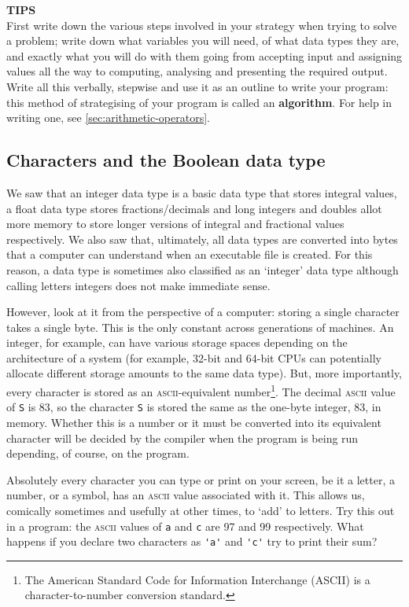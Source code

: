 \documentclass[11pt,oneside]{article}
\newcommand{\eb}[1]{\textbf{\scriptsize{\sffamily\addfontfeatures{LetterSpace=7} #1\\[.35em]}}}
\begin{document}
{{{{{{{\begin{errorbox}
\eb{TIPS }
First write down the various steps involved in your strategy when trying to solve a problem; write down what variables you will need, of what data types they are, and exactly what you will do with them going from accepting input and assigning values all the way to computing, analysing and presenting the required output. Write all this verbally, stepwise and use it as an outline to write your program: this method of strategising of your program is called an \textbf{algorithm}. For help in writing one, see \ref{sec:arithmetic-operators}.
\end{errorbox}

\subsection{Characters and the Boolean data type}\label{sec:characters-and-the-boolean-data-type}

We saw that an integer data type is a basic data type that stores integral values, a float data type stores fractions/decimals and long integers and doubles allot more memory to store longer versions of integral and fractional values respectively. We also saw that, ultimately, all data types are converted into bytes that a computer can understand when an executable file is created. For this reason, a  data type is sometimes also classified as an `integer' data type although calling letters integers does not make immediate sense.

However, look at it from the perspective of a computer: storing a single character takes a single byte. This is the only constant across generations of machines. An integer, for example, can have various storage spaces depending on the architecture of a system (for example, 32-bit and 64-bit CPUs can potentially allocate different storage amounts to the same data type). But, more importantly, every character is stored as an \textsc{ascii}-equivalent number\footnote{The American Standard Code for Information Interchange (\textsc{ASCII}) is a character-to-number conversion standard.}. The decimal \textsc{ascii} value of \verb+S+ is 83, so the character \verb+S+ is stored the same as the one-byte integer, 83, in memory. Whether this is a number or it must be converted into its equivalent character will be decided by the compiler when the program is being run depending, of course, on the program.

Absolutely every character you can type or print on your screen, be it a letter, a number, or a symbol, has an \textsc{ascii} value associated with it. This allows us, comically sometimes and usefully at other times, to `add' to letters. Try this out in a program: the \textsc{ascii} values of \verb+a+ and \verb+c+ are 97 and 99 respectively. What happens if you declare two characters as \verb+'a'+ and \verb+'c'+ try to print their sum?

}}}}}}}
\end{document}
